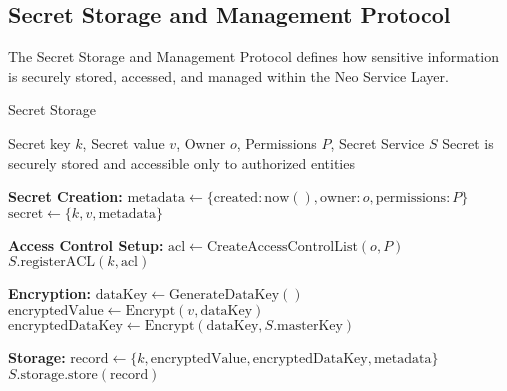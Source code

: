 \subsection{Secret Storage and Management Protocol}
\label{subsec:secret-protocol}

The Secret Storage and Management Protocol defines how sensitive information is securely stored, accessed, and managed within the Neo Service Layer.

\begin{tcolorbox}[
    enhanced,
    colback=blue!5!white,
    colframe=blue!75!black,
    arc=5mm,
    boxrule=1.5pt,
    title=Secret Protocol,
    fonttitle=\bfseries,
    coltitle=white,
    attach boxed title to top left={yshift=-2mm, xshift=5mm},
    boxed title style={colback=blue!75!black, rounded corners},
    shadow={2mm}{-2mm}{0mm}{black!50},
    drop fuzzy shadow
]
\begin{tcolorbox}[
    enhanced,
    colback=blue!5!white,
    colframe=blue!75!black,
    arc=5mm,
    boxrule=1.5pt,
    title=Protocol,
    fonttitle=\bfseries,
    coltitle=white,
    attach boxed title to top left={yshift=-2mm, xshift=5mm},
    boxed title style={colback=blue!75!black, rounded corners},
    shadow={2mm}{-2mm}{0mm}{black!50},
    drop fuzzy shadow
]
\begin{protocol}{Secret Storage}
\label{prot:secret-storage}
\begin{algorithmic}[1]
\Require Secret key $k$, Secret value $v$, Owner $o$, Permissions $P$, Secret Service $S$
\Ensure Secret is securely stored and accessible only to authorized entities

\State \textbf{Secret Creation:}
\State $\text{metadata} \gets \{\text{created}: \text{now}(), \text{owner}: o, \text{permissions}: P\}$
\State $\text{secret} \gets \{k, v, \text{metadata}\}$

\State \textbf{Access Control Setup:}
\State $\text{acl} \gets \text{CreateAccessControlList}(o, P)$
\State $S.\text{registerACL}(k, \text{acl})$

\State \textbf{Encryption:}
\State $\text{dataKey} \gets \text{GenerateDataKey}()$
\State $\text{encryptedValue} \gets \text{Encrypt}(v, \text{dataKey})$
\State $\text{encryptedDataKey} \gets \text{Encrypt}(\text{dataKey}, S.\text{masterKey})$

\State \textbf{Storage:}
\State $\text{record} \gets \{k, \text{encryptedValue}, \text{encryptedDataKey}, \text{metadata}\}$
\State $S.\text{storage}.\text{store}(\text{record})$


\end{algorithmic}
\end{protocol}
\end{tcolorbox}
\end{tcolorbox}
